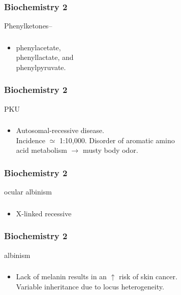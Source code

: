 \documentclass[11pt]{beamer}
\begin{document}
\begin{frame}
 \frametitle{Biochemistry 2}
Phenylketones–
\end{frame}

\begin{frame}
 \frametitle{}
\begin{itemize}
\item phenylacetate, \\ phenyllactate, and \\ phenylpyruvate.
\end{itemize}
\end{frame}

\begin{frame}
 \frametitle{Biochemistry 2}
PKU 
\end{frame}

\begin{frame}
 \frametitle{}
\begin{itemize}
\item Autosomal-recessive disease. \\ Incidence ${\simeq}$ 1:10,000. Disorder of aromatic amino \\ acid metabolism ${\rightarrow}$ musty body odor.
\end{itemize}
\end{frame}

\begin{frame}
 \frametitle{Biochemistry 2}
ocular albinism 
\end{frame}

\begin{frame}
 \frametitle{}
\begin{itemize}
\item X-linked recessive 
\end{itemize}
\end{frame}

\begin{frame}
 \frametitle{Biochemistry 2}
albinism 
\end{frame}

\begin{frame}
 \frametitle{}
\begin{itemize}
\item Lack of melanin results in an ${\uparrow}$ risk of skin cancer. \\ Variable inheritance due to locus heterogeneity.
\end{itemize}
\end{frame}
\end{document}
